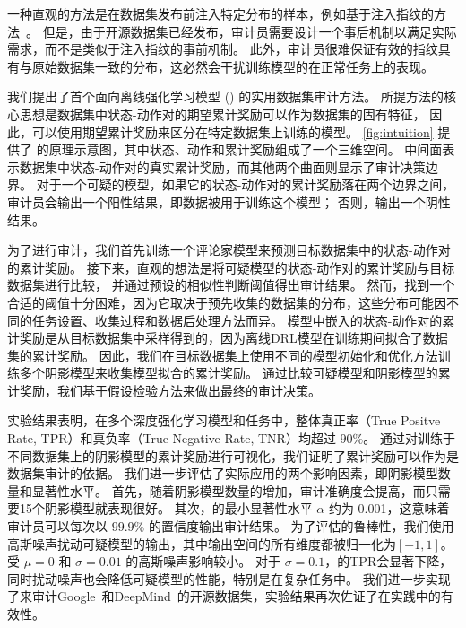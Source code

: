 一种直观的方法是在数据集发布前注入特定分布的样本，例如基于注入指纹的方法~\cite{DBLP:conf/uss/000100022, DBLP:conf/uss/WangYVZZ18}。
但是，由于开源数据集已经发布，审计员需要设计一个事后机制以满足实际需求，而不是类似于注入指纹的事前机制。
此外，审计员很难保证有效的指纹具有与原始数据集一致的分布，这必然会干扰训练模型的在正常任务上的表现。

我们提出了首个面向离线强化学习模型 (\sysnameo) 的实用数据集审计方法。
所提方法的核心思想是数据集中状态-动作对的期望累计奖励可以作为数据集的固有特征，
因此，可以使用期望累计奖励来区分在特定数据集上训练的模型。
\autoref{fig:intuition} 提供了 \sysnameo 的原理示意图，其中状态、动作和累计奖励组成了一个三维空间。
中间面表示数据集中状态-动作对的真实累计奖励，而其他两个曲面则显示了审计决策边界。
对于一个可疑的模型，如果它的状态-动作对的累计奖励落在两个边界之间，
审计员会输出一个阳性结果，即数据被用于训练这个模型；
否则，输出一个阴性结果。

为了进行审计，我们首先训练一个评论家模型来预测目标数据集中的状态-动作对的累计奖励。
接下来，直观的想法是将可疑模型的状态-动作对的累计奖励与目标数据集进行比较，
并通过预设的相似性判断阈值得出审计结果。
然而，找到一个合适的阈值十分困难，因为它取决于预先收集的数据集的分布，这些分布可能因不同的任务设置、收集过程和数据后处理方法而异。
模型中嵌入的状态-动作对的累计奖励是从目标数据集中采样得到的，因为离线DRL模型在训练期间拟合了数据集的累计奖励。
因此，我们在目标数据集上使用不同的模型初始化和优化方法训练多个阴影模型来收集模型拟合的累计奖励。
通过比较可疑模型和阴影模型的累计奖励，我们基于假设检验方法来做出最终的审计决策。

实验结果表明，\sysnameo 在多个深度强化学习模型和任务中，整体真正率（True Positve Rate, TPR）和真负率（True Negative Rate, TNR）均超过 $90\%$。
通过对训练于不同数据集上的阴影模型的累计奖励进行可视化，我们证明了累计奖励可以作为是数据集审计的依据。
我们进一步评估了\sysnameo 实际应用的两个影响因素，即阴影模型数量和显著性水平。
首先，随着阴影模型数量的增加，审计准确度会提高，而\sysnameo 只需要15个阴影模型就表现很好。
其次，\sysnameo 的最小显著性水平 $\alpha$ 约为 0.001，这意味着审计员可以每次以 $99.9\%$ 的置信度输出审计结果。
为了评估\sysnameo 的鲁棒性，我们使用高斯噪声扰动可疑模型的输出，其中输出空间的所有维度都被归一化为$[-1,1]$。
\sysnameo 受 $\mu=0$ 和 $\sigma=0.01$ 的高斯噪声影响较小。
对于 $\sigma=0.1$，\sysnameo 的TPR会显著下降，同时扰动噪声也会降低可疑模型的性能，特别是在复杂任务中。
我们进一步实现了\sysnameo 来审计Google~\cite{DBLP:journals/corr/abs-2004-07219}和DeepMind~\cite{DBLP:conf/nips/Gulcehre0NPCZAM20}的开源数据集，实验结果再次佐证了\sysnameo 在实践中的有效性。

